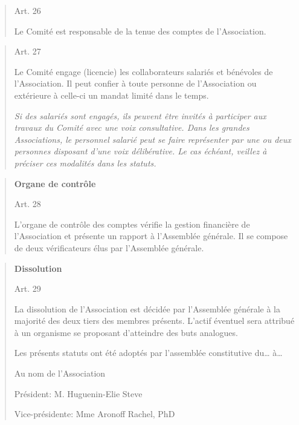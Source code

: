 \documentclass[10pt]{article}
\begin{document}
\begin{quote}
Art. 26

Le Comité est responsable de la tenue des comptes de l'Association.

\end{quote}
\begin{quote}
Art. 27

Le Comité engage (licencie) les collaborateurs salariés et bénévoles de
l'Association. Il peut confier à toute personne de l'Association ou
extérieure à celle-ci un mandat limité dans le temps.

\emph{Si des salariés sont engagés, ils peuvent être invités à
participer aux travaux du Comité avec une voix consultative. Dans les
grandes Associations, le personnel salarié peut se faire représenter par
une ou deux personnes disposant d'une voix délibérative. Le cas échéant,
veillez à préciser ces modalités dans les statuts.}

\end{quote}
\begin{quote}
\textbf{Organe de contrôle}

Art. 28

L'organe de contrôle des comptes vérifie la gestion financière de
l'Association et présente un rapport à l'Assemblée générale. Il se
compose de deux vérificateurs élus par l'Assemblée générale.

\end{quote}
\begin{quote}
\textbf{Dissolution}

Art. 29

La dissolution de l'Association est décidée par l'Assemblée générale à
la majorité des deux tiers des membres présents. L'actif éventuel sera
attribué à un organisme se proposant d'atteindre des buts analogues.

Les présents statuts ont été adoptés par l'assemblée constitutive
du\ldots{} à\ldots{}

Au nom de l'Association

Président: M. Huguenin-Elie Steve

Vice-présidente: Mme Aronoff Rachel, PhD
\end{quote}

\end{document}
